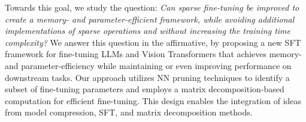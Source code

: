 %
%
Towards this goal, we study the question: \emph{Can sparse fine-tuning be improved to create a memory- and parameter-efficient framework, while avoiding additional implementations of sparse operations and without increasing the training time complexity?} We answer this question in the affirmative, by proposing a new SFT framework for fine-tuning LLMs and Vision Transformers that achieves memory- and parameter-efficiency while maintaining or even improving performance on downstream tasks. Our approach utilizes NN pruning techniques to identify a subset of fine-tuning parameters and employs a matrix decomposition-based computation for efficient fine-tuning. This design enables the integration of ideas from model compression, SFT, and matrix decomposition methods.

